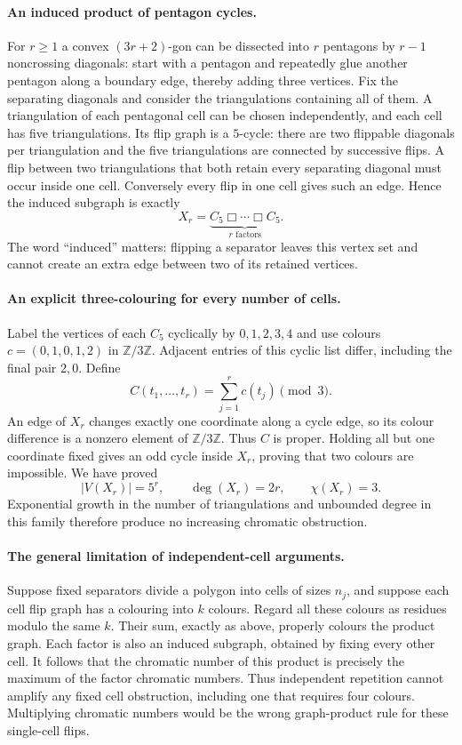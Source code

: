 \documentclass[11pt,a4paper]{article}
\begin{document}
\paragraph{An induced product of pentagon cycles.}
For $r\ge1$ a convex $(3r+2)$-gon can be dissected into $r$ pentagons by
$r-1$ noncrossing diagonals: start with a pentagon and repeatedly glue another
pentagon along a boundary edge, thereby adding three vertices. Fix the
separating diagonals and consider the triangulations containing all of them.
A triangulation of each pentagonal cell can be chosen independently, and each
cell has five triangulations. Its flip graph is a $5$-cycle: there are two
flippable diagonals per triangulation and the five triangulations are connected
by successive flips.
A flip between two triangulations that both retain every separating diagonal
must occur inside one cell. Conversely every flip in one cell gives such an
edge. Hence the induced subgraph is exactly
\[
 X_r=\underbrace{C_5\mathbin\Box\cdots\mathbin\Box C_5}_{r\text{ factors}}.
\]
The word ``induced'' matters: flipping a separator leaves this vertex set
and cannot create an extra edge between two of its retained vertices.

\paragraph{An explicit three-colouring for every number of cells.}
Label the vertices of each $C_5$ cyclically by $0,1,2,3,4$ and use colours
$c=(0,1,0,1,2)$ in $\mathbb Z/3\mathbb Z$. Adjacent entries of this cyclic
list differ, including the final pair $2,0$. Define
\[
 C(t_1,\ldots,t_r)=\sum_{j=1}^r c(t_j)\pmod3.
\]
An edge of $X_r$ changes exactly one coordinate along a cycle edge, so its
colour difference is a nonzero element of $\mathbb Z/3\mathbb Z$. Thus $C$
is proper. Holding all but one coordinate fixed gives an odd cycle inside
$X_r$, proving that two colours are impossible. We have proved
\[
 |V(X_r)|=5^r,\qquad \deg(X_r)=2r,\qquad \chi(X_r)=3.
\]
Exponential growth in the number of triangulations and unbounded degree in
this family therefore produce no increasing chromatic obstruction.

\paragraph{The general limitation of independent-cell arguments.}
Suppose fixed separators divide a polygon into cells of sizes $n_j$, and
suppose each cell flip graph has a colouring into $k$ colours. Regard all
these colours as residues modulo the same $k$. Their sum, exactly as above,
properly colours the product graph. Each factor is also an induced subgraph,
obtained by fixing every other cell. It follows that the chromatic number of
this product is precisely the maximum of the factor chromatic numbers.
Thus independent repetition cannot amplify any fixed cell obstruction,
including one that requires four colours. Multiplying chromatic numbers would
be the wrong graph-product rule for these single-cell flips.
\end{document}
